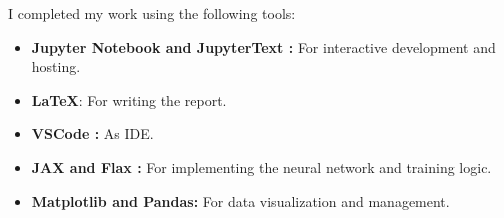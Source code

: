 \documentclass[conference,a4paper]{IEEEtran}
\begin{document}
I completed my work using the following tools:
\begin{itemize}
    \item \textbf{Jupyter Notebook \cite{Kluyver2016jupyter} and JupyterText \cite{woutsMwoutsJupytext2025}:} For interactive development and hosting.
    \item \textbf{\LaTeX}: For writing the report.
    \item \textbf{VSCode \cite{MicrosoftVscode2025}:} As IDE.
    \item \textbf{JAX \cite{jax2018github} and Flax \cite{flax2020github}:} For implementing the neural network and training logic.
    \item \textbf{Matplotlib\cite{Hunter:2007} and Pandas\cite{thepandasdevelopmentteamPandasdevPandasPandas}:} For data visualization and management.
\end{itemize}




\end{document}
